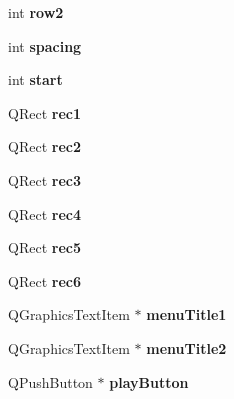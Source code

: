 \begin{DoxyCompactItemize}
\item 
\hypertarget{class_dialog_a149556b29203fda2b68ed4556860b31e}{int {\bfseries row2}}\label{class_dialog_a149556b29203fda2b68ed4556860b31e}

\item 
\hypertarget{class_dialog_abec81869b61433e564e1703f1af4090f}{int {\bfseries spacing}}\label{class_dialog_abec81869b61433e564e1703f1af4090f}

\item 
\hypertarget{class_dialog_a12ad78d69ca2066e27a7818cb8d8df0f}{int {\bfseries start}}\label{class_dialog_a12ad78d69ca2066e27a7818cb8d8df0f}

\item 
\hypertarget{class_dialog_a06bd70e09802235c7cb6a5a06ef0c6df}{Q\-Rect {\bfseries rec1}}\label{class_dialog_a06bd70e09802235c7cb6a5a06ef0c6df}

\item 
\hypertarget{class_dialog_aee569a2047c34a53f2142cd9fdab3ca4}{Q\-Rect {\bfseries rec2}}\label{class_dialog_aee569a2047c34a53f2142cd9fdab3ca4}

\item 
\hypertarget{class_dialog_a9c93b189956a82a5280f4119b95be988}{Q\-Rect {\bfseries rec3}}\label{class_dialog_a9c93b189956a82a5280f4119b95be988}

\item 
\hypertarget{class_dialog_acd72b2182c9f2fd649a8882241393fe9}{Q\-Rect {\bfseries rec4}}\label{class_dialog_acd72b2182c9f2fd649a8882241393fe9}

\item 
\hypertarget{class_dialog_a7c0b45761b6d9bd7015e3a667de1b143}{Q\-Rect {\bfseries rec5}}\label{class_dialog_a7c0b45761b6d9bd7015e3a667de1b143}

\item 
\hypertarget{class_dialog_a6263f367496ac5002a1fb30ce9883294}{Q\-Rect {\bfseries rec6}}\label{class_dialog_a6263f367496ac5002a1fb30ce9883294}

\item 
\hypertarget{class_dialog_a67fe7f9070c47b2ab87a9763a7516a3b}{Q\-Graphics\-Text\-Item $\ast$ {\bfseries menu\-Title1}}\label{class_dialog_a67fe7f9070c47b2ab87a9763a7516a3b}

\item 
\hypertarget{class_dialog_abb9dc476b48a1d85be4466e27cb73a3a}{Q\-Graphics\-Text\-Item $\ast$ {\bfseries menu\-Title2}}\label{class_dialog_abb9dc476b48a1d85be4466e27cb73a3a}

\item 
\hypertarget{class_dialog_aef826c00a0e5c5f415ece1e1aa153f5e}{Q\-Push\-Button $\ast$ {\bfseries play\-Button}}\label{class_dialog_aef826c00a0e5c5f415ece1e1aa153f5e}


\end{DoxyCompactItemize}

